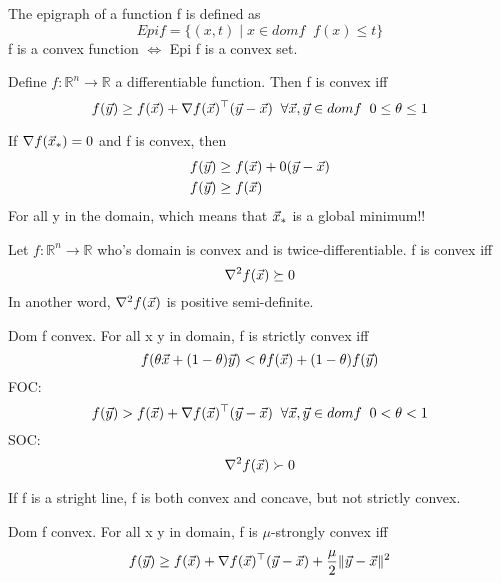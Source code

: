 \begin{definition}[Epigraph]
	The epigraph of a function f is defined as
	\[
Epi f = \{(x, t)\;|\;x\in dom f \;\; f(x) \le t\}
	\]
	f is a convex function $\iff$ Epi f is a convex set.
\end{definition}

\begin{theorem}
	Define $f:\mathbb{R}^n\rightarrow\mathbb{R}$ a differentiable function. Then f is convex iff
	\[
f(\vec{y})\ge f(\vec{x})+\nabla f(\vec{x})^\top(\vec{y}-\vec{x}) \;\; \forall \vec{x}, \vec{y}\in dom f\;\;0\le\theta\le1
	\]
\end{theorem}

\begin{remark}
	If $\nabla f(\vec{x}_*) = 0$ and f is convex, then
	\begin{align*}
		f(\vec{y}) &\ge f(\vec{x})+0(\vec{y}-\vec{x})\\
		f(\vec{y}) &\ge f(\vec{x})
	\end{align*}
	For all y in the domain, which means that $\vec{x}_*$ is a global minimum!!
\end{remark}

\begin{definition}
	Let $f:\mathbb{R}^n\rightarrow\mathbb{R}$ who's domain is convex and is twice-differentiable. f is convex iff
	\[
	\nabla^2f(\vec{x}) \succeq 0
	\]
	In another word, $\nabla^2f(\vec{x})$ is positive semi-definite.
\end{definition}

\begin{definition}
	Dom f convex. For all x y in domain, f is strictly convex iff
	\[
f(\theta\vec{x}+(1-\theta)\vec{y}) < \theta f(\vec{x})+(1-\theta)f(\vec{y})
	\]
	FOC:
	\[
f(\vec{y}) > f(\vec{x})+\nabla f(\vec{x})^\top(\vec{y}-\vec{x}) \;\; \forall \vec{x}, \vec{y}\in dom f\;\; 0<\theta<1
	\]
	SOC:
	\[
\nabla^2f(\vec{x}) \succ 0
	\]
\end{definition}

\begin{remark}
	If f is a stright line, f is both convex and concave, but not strictly convex.
\end{remark}

\begin{definition}
	Dom f convex. For all x y in domain, f is $\mu$-strongly convex iff
	\[
f(\vec{y})\ge f(\vec{x})+\nabla f(\vec{x})^\top(\vec{y}-\vec{x}) + \frac{\mu}{2}\|\vec{y}-\vec{x}\|^2
	\]
\end{definition}

